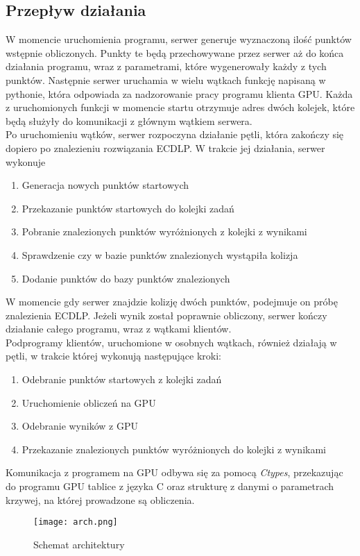\subsection{Przepływ działania}
W momencie uruchomienia programu, serwer generuje wyznaczoną ilość punktów wstępnie obliczonych.
Punkty te będą przechowywane przez serwer aż do końca działania programu, wraz z parametrami, które
wygenerowały każdy z tych punktów. Następnie serwer uruchamia w wielu wątkach funkcję napisaną w pythonie, która
odpowiada za nadzorowanie pracy programu klienta GPU. Każda z uruchomionych funkcji w momencie startu
otrzymuje adres dwóch kolejek, które będą służyły do komunikacji z głównym wątkiem serwera. \\
Po uruchomieniu wątków, serwer rozpoczyna działanie pętli, która zakończy się dopiero po znalezieniu
rozwiązania ECDLP. W trakcie jej działania, serwer wykonuje
\begin{enumerate}
    \item Generacja nowych punktów startowych
    \item Przekazanie punktów startowych do kolejki zadań
    \item Pobranie znalezionych punktów wyróżnionych z kolejki z wynikami
    \item Sprawdzenie czy w bazie punktów znalezionych wystąpiła kolizja
    \item Dodanie punktów do bazy punktów znalezionych
\end{enumerate}
W momencie gdy serwer znajdzie kolizję dwóch punktów, podejmuje on próbę znalezienia ECDLP.
Jeżeli wynik został poprawnie obliczony, serwer kończy działanie całego programu, wraz z wątkami klientów. \\
Podprogramy klientów, uruchomione w osobnych wątkach,
również działają w pętli, w trakcie której wykonują następujące kroki:
\begin{enumerate}
    \item Odebranie punktów startowych z kolejki zadań
    \item Uruchomienie obliczeń na GPU
    \item Odebranie wyników z GPU
    \item Przekazanie znalezionych punktów wyróżnionych do kolejki z wynikami
\end{enumerate}
Komunikacja z programem na GPU odbywa się za pomocą \textit{Ctypes}, przekazując
do programu GPU tablice z języka C oraz strukturę z danymi o parametrach krzywej,
na której prowadzone są obliczenia.
\begin{figure}[!h]
    \centering \texttt{[image: arch.png]}
    \caption{Schemat architektury}
\end{figure}
